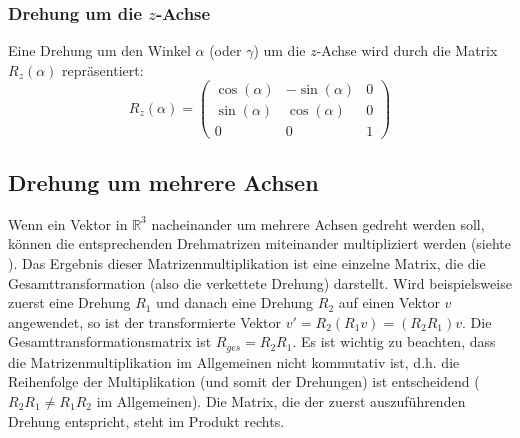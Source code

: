 \subsubsection*{Drehung um die $z$-Achse}
Eine Drehung um den Winkel $\alpha$ (oder $\gamma$) um die $z$-Achse wird durch die Matrix $R_z(\alpha)$ repräsentiert:
\[
   R_z(\alpha) = \begin{pmatrix}
       \cos(\alpha) & -\sin(\alpha) & 0 \\
       \sin(\alpha) & \cos(\alpha) & 0 \\
       0 & 0 & 1
   \end{pmatrix}
\]

\subsection{Drehung um mehrere Achsen}
Wenn ein Vektor in $\mathbb{R}^3$ nacheinander um mehrere Achsen gedreht werden soll, können die entsprechenden Drehmatrizen miteinander multipliziert werden (siehte ). Das Ergebnis dieser Matrizenmultiplikation ist eine einzelne Matrix, die die Gesamttransformation (also die verkettete Drehung) darstellt.
Wird beispielsweise zuerst eine Drehung $R_1$ und danach eine Drehung $R_2$ auf einen Vektor $v$ angewendet, so ist der transformierte Vektor $v' = R_2 (R_1 v) = (R_2 R_1) v$. Die Gesamttransformationsmatrix ist $R_{ges} = R_2 R_1$.
Es ist wichtig zu beachten, dass die Matrizenmultiplikation im Allgemeinen nicht kommutativ ist, d.h. die Reihenfolge der Multiplikation (und somit der Drehungen) ist entscheidend ($R_2 R_1 \neq R_1 R_2$ im Allgemeinen). Die Matrix, die der zuerst auszuführenden Drehung entspricht, steht im Produkt rechts.